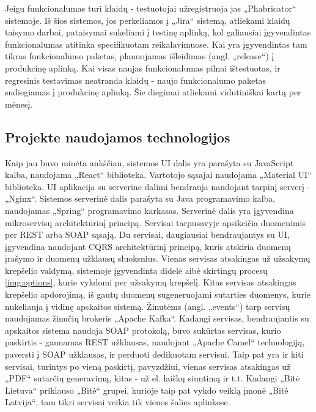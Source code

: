 Jeigu funkcionalumas turi klaidų - testuotojai užregistruoja jas „Phabricator“ sistemoje. Iš šios sistemos, jos perkeliamos į „Jira“ sistemą, atliekami klaidų taisymo darbai, pataisymai
sukeliami į testinę aplinką, kol galiausiai įgyvendintas funkcionalumas atitinka specifikuotam reikalavimuose. Kai yra įgyvendintas tam tikras funkcionalumo paketas, planuojamas
išleidimas (angl. „release“) į produkcinę aplinką. Kai visas naujas funkcionalumas pilnai ištestuotas, ir regresinis testavimas neatranda klaidų - naujo funkcionalumo paketas
sudiegiamas į produkcinę aplinką. Šie diegimai atliekami vidutiniškai kartą per mėnesį.


\subsection{Projekte naudojamos technologijos}
Kaip jau buvo minėta ankščiau, sistemos UI dalis yra parašyta su JavaScript kalba, naudojama „React“ biblioteka. Vartotojo sąsajai naudojama „Material UI“ biblioteka.
UI aplikacija su serverine dalimi bendrauja naudojant tarpinį serverį - „Nginx“.
Sistemos serverinė dalis parašyta su Java programavimo kalba, naudojamas „Spring“ programavimo karkasas. Serverinė dalis yra
įgyvendina mikroservisų architektūrinį principą. Servisai tarpusavyje apsikeičia duomenimis per
REST arba SOAP sąsają. Du servisai, daugiausiai bendraujantys su UI, įgyvendina naudojant CQRS architektūrinį principą,
kuris atskiria duomenų įrašymo ir duomenų užklausų sluoksnius. Vienas servisas atsakingas už užsakymų krepšelio valdymą, sistemoje įgyvendinta didelė aibė skirtingų procesų \ref{img:options},
kurie vykdomi per užsakymų krepšelį. Kitas servisas atsakingas krepšelio apdorojimą, iš gautų duomenų sugeneruojami sutarties duomenys, kurie nukeliauja į vidinę apskaitos sistemą.
Žinutėms (angl. „events“) tarp servisų naudojamas žinučių brokeris „Apache Kafka“. Kadangi servisas, bendraujantis su apskaitos sistema naudoja SOAP protokolą, buvo sukūrtas
servisas, kurio paskirtis - gaunamas REST užklausas, naudojant „Apache Camel“ technologiją, paversti į SOAP užklausas, ir perduoti dedikuotam servisui.
Taip pat yra ir kiti servisai, turintys po vieną paskirtį, pavyzdžiui, vienas servisas atsakingas už „PDF“ sutarčių generavimą, kitas - už el. laiškų siuntimą ir t.t.
Kadangi „Bitė Lietuva“ priklauso „Bitė“ grupei, kurioje taip pat vykdo veiklą įmonė „Bitė Latvija“, tam tikri servisai veikia tik vienos šalies aplinkose.

